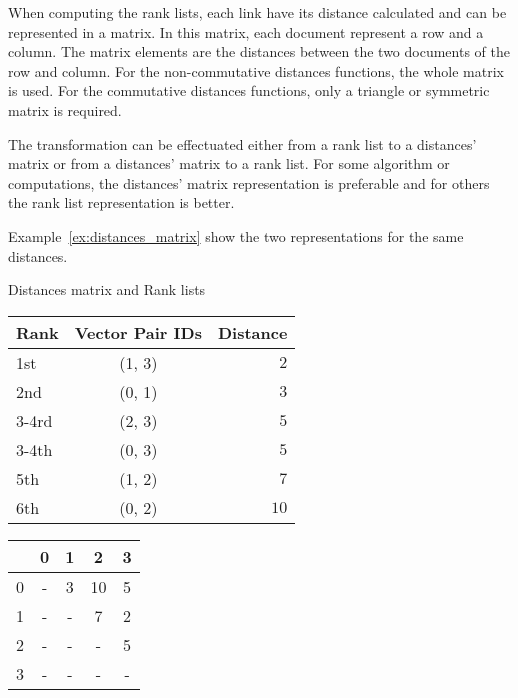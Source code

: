 When computing the rank lists, each link have its distance calculated and can be represented in a matrix.
In this matrix, each document represent a row and a column.
The matrix elements are the distances between the two documents of the row and column.
For the non-commutative distances functions, the whole matrix is used.
For the commutative distances functions, only a triangle or symmetric matrix is required.

The transformation can be effectuated either from a rank list to a distances' matrix or from a distances' matrix to a rank list.
For some algorithm or computations, the distances' matrix representation is preferable and for others the rank list representation is better.

Example~\ref{ex:distances_matrix} show the two representations for the same distances.

\begin{example}
  \centering
  \caption{Distances matrix and Rank lists}
  \label{ex:distances_matrix}
  \begin{subexample}{\linewidth}
    \centering
    \begin{tabular}{l c r}
      \toprule
      Rank & Vector Pair IDs & Distance \\
      \midrule
      1st   & (1, 3) & $2$ \\
      2nd   & (0, 1) & $3$ \\
      3-4rd & (2, 3) & $5$ \\
      3-4th & (0, 3) & $5$ \\
      5th   & (1, 2) & $7$ \\
      6th   & (0, 2) & $10$ \\
      \bottomrule
    \end{tabular}
  \end{subexample}

  \vspace{0.5cm}

  \begin{subexample}{\linewidth}
    \centering
    \begin{tabular}{c|c c c c}
      \toprule
        & 0 & 1 & 2  & 3 \\
      \midrule
      0 & - & 3 & 10 & 5 \\
      1 & - & - & 7  & 2 \\
      2 & - & - & -  & 5 \\
      3 & - & - & -  & - \\
      \bottomrule
    \end{tabular}
  \end{subexample}
\end{example}

